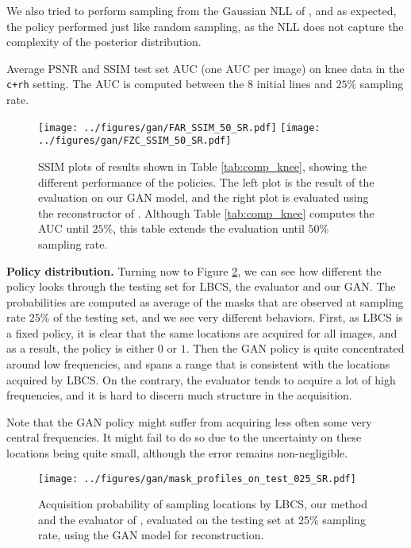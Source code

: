 We also tried to perform sampling from the Gaussian NLL of \citet{zhang2019reducing}, and as expected, the policy performed just like random sampling, as the NLL does not capture the complexity of the posterior distribution.

\begin{table}[!ht]
    \centering
    
    \caption{Average PSNR and SSIM test set AUC (one AUC per image) on knee data in the \texttt{c+rh} setting. The AUC is computed between the $8$ initial lines and $25\%$ sampling rate.}\label{tab:comp_knee} 
\end{table}

\begin{figure}[!ht]
    \centering
    \texttt{[image: ../figures/gan/FAR\_SSIM\_50\_SR.pdf]}
    \texttt{[image: ../figures/gan/FZC\_SSIM\_50\_SR.pdf]}
    \caption{SSIM plots of results shown in Table \ref{tab:comp_knee}, showing the different performance of the policies. The left plot is the result of the evaluation on our GAN model, and the right plot is evaluated using the reconstructor of \citet{zhang2019reducing}. Although Table \ref{tab:comp_knee} computes the AUC until $25\%$, this table extends the evaluation until $50\%$ sampling rate.}\label{fig:knee_curve_ssim}
\end{figure}

\textbf{Policy distribution.} Turning now to Figure \ref{fig:policy_dist}, we can see how different the policy looks through the testing set for LBCS, the evaluator and our GAN. The probabilities are computed as average of the masks that are observed at sampling rate $25\%$ of the testing set, and we see very different behaviors. First, as LBCS is a fixed policy, it is clear that the same locations are acquired for all images, and as a result, the policy is either $0$ or $1$. Then the GAN policy is quite concentrated around low frequencies, and spans a range that is consistent with the locations acquired by LBCS. On the contrary, the evaluator tends to acquire a lot of high frequencies, and it is hard to discern much structure in the acquisition.

Note that the GAN policy might suffer from acquiring less often some very central frequencies. It might fail to do so due to the uncertainty on these locations being quite small, although the error remains non-negligible. 

\begin{figure}[!ht]
    \centering
    \texttt{[image: ../figures/gan/mask\_profiles\_on\_test\_025\_SR.pdf]}
    \caption{Acquisition probability of sampling locations by LBCS, our method and the evaluator of \citet{zhang2019reducing}, evaluated on the testing set at $25\%$ sampling rate, using the GAN model for reconstruction.}\label{fig:policy_dist}
\end{figure}


